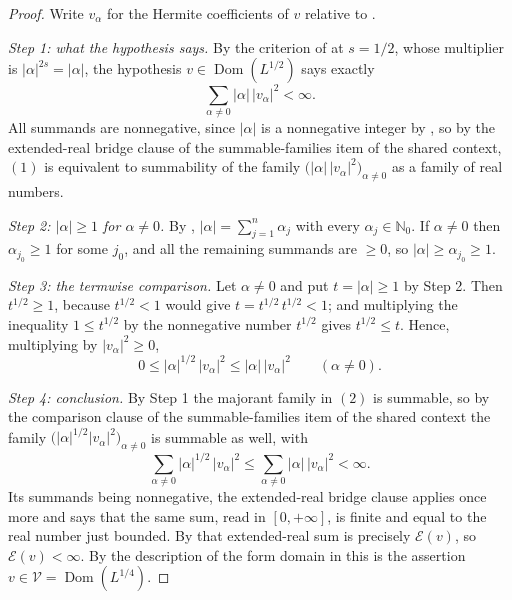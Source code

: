 \begin{proof}
Write $v_\alpha$ for the Hermite coefficients of $v$ relative to
.

\emph{Step 1: what the hypothesis says.}
By the criterion of  at $s = 1/2$, whose multiplier is
$|\alpha|^{2s} = |\alpha|$, the hypothesis $v \in \operatorname{Dom}(L^{1/2})$
says exactly
\begin{equation*}
  \sum_{\alpha \neq 0} |\alpha|\,|v_\alpha|^2 < \infty . \tag{1}
\end{equation*}
All summands are nonnegative, since $|\alpha|$ is a nonnegative integer by
, so by the extended-real bridge clause of the
summable-families item of the shared context, $(1)$ is equivalent to
summability of the family $\bigl(|\alpha|\,|v_\alpha|^2\bigr)_{\alpha \neq 0}$
as a family of real numbers.

\emph{Step 2: $|\alpha| \geq 1$ for $\alpha \neq 0$.}
By , $|\alpha| = \sum_{j=1}^n \alpha_j$ with every
$\alpha_j \in \mathbb{N}_0$.  If $\alpha \neq 0$ then $\alpha_{j_0} \geq 1$ for
some $j_0$, and all the remaining summands are $\geq 0$, so
$|\alpha| \geq \alpha_{j_0} \geq 1$.

\emph{Step 3: the termwise comparison.}
Let $\alpha \neq 0$ and put $t = |\alpha| \geq 1$ by Step 2.  Then
$t^{1/2} \geq 1$, because $t^{1/2} < 1$ would give
$t = t^{1/2}\,t^{1/2} < 1$; and multiplying the inequality $1 \leq t^{1/2}$ by
the nonnegative number $t^{1/2}$ gives $t^{1/2} \leq t$.  Hence, multiplying by
$|v_\alpha|^2 \geq 0$,
\begin{equation*}
  0 \leq |\alpha|^{1/2}\,|v_\alpha|^2 \leq |\alpha|\,|v_\alpha|^2
  \qquad (\alpha \neq 0). \tag{2}
\end{equation*}

\emph{Step 4: conclusion.}
By Step 1 the majorant family in $(2)$ is summable, so by the comparison clause
of the summable-families item of the shared context the family
$\bigl(|\alpha|^{1/2}|v_\alpha|^2\bigr)_{\alpha \neq 0}$ is summable as well,
with
\[
  \sum_{\alpha \neq 0} |\alpha|^{1/2}\,|v_\alpha|^2
    \leq \sum_{\alpha \neq 0} |\alpha|\,|v_\alpha|^2 < \infty .
\]
Its summands being nonnegative, the extended-real bridge clause applies once
more and says that the same sum, read in $[0,+\infty]$, is finite and equal to
the real number just bounded.  By  that extended-real sum is
precisely $\mathcal{E}(v)$, so $\mathcal{E}(v) < \infty$.  By the description of
the form domain in  this is the assertion
$v \in \mathcal{V} = \operatorname{Dom}(L^{1/4})$.
\end{proof}
